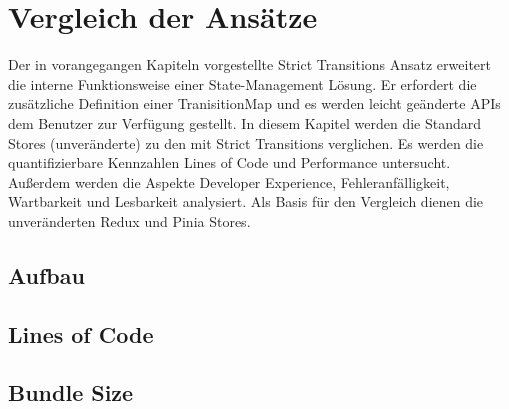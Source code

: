 \chapter{Vergleich der Ansätze} \label{vergleich}


Der in vorangegangen Kapiteln vorgestellte Strict Transitions Ansatz erweitert die interne Funktionsweise einer State-Management Lösung. Er erfordert die zusätzliche Definition einer TranisitionMap und es werden leicht geänderte APIs dem Benutzer zur Verfügung gestellt. In diesem Kapitel werden die Standard Stores (unveränderte) zu den mit Strict Transitions verglichen. Es werden die quantifizierbare Kennzahlen Lines of Code und Performance untersucht. Außerdem werden die Aspekte Developer Experience, Fehleranfälligkeit, Wartbarkeit und Lesbarkeit analysiert. Als Basis für den Vergleich dienen die unveränderten Redux und Pinia Stores.

\section{Aufbau}

% 
%


\section{Lines of Code}

\section{Bundle Size}

